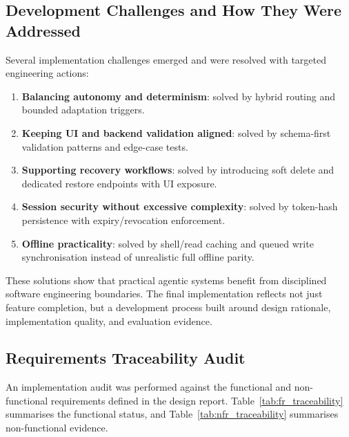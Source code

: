 \documentclass[12pt]{article}
\begin{document}
\subsection{Development Challenges and How They Were Addressed}
Several implementation challenges emerged and were resolved with targeted engineering actions:
\begin{enumerate}
    \item \textbf{Balancing autonomy and determinism}: solved by hybrid routing and bounded adaptation triggers.
    \item \textbf{Keeping UI and backend validation aligned}: solved by schema-first validation patterns and edge-case tests.
    \item \textbf{Supporting recovery workflows}: solved by introducing soft delete and dedicated restore endpoints with UI exposure.
    \item \textbf{Session security without excessive complexity}: solved by token-hash persistence with expiry/revocation enforcement.
    \item \textbf{Offline practicality}: solved by shell/read caching and queued write synchronisation instead of unrealistic full offline parity.
\end{enumerate}

These solutions show that practical agentic systems benefit from disciplined software engineering boundaries. The final implementation reflects not just feature completion, but a development process built around design rationale, implementation quality, and evaluation evidence.

\subsection{Requirements Traceability Audit}
\label{sec:req_traceability}

An implementation audit was performed against the functional and non-functional requirements defined in the design report. Table~\ref{tab:fr_traceability} summarises the functional status, and Table~\ref{tab:nfr_traceability} summarises non-functional evidence.
\end{document}
